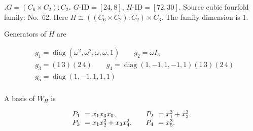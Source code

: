 \documentclass[12pt]{amsart}
\makeatletter
\numberwithin{equation}{section}
\theoremstyle{plain}
\theoremstyle{definition}
\theoremstyle{remark}
\DeclareMathOperator{\diag}{diag}
\newcommand{\PBasisLabel}[1]{\mathrlap{P_{#1}}\phantom{P_{99}}}
\newenvironment{SecEightAlignedBasis}[1]{%
  \begingroup\renewcommand{\arraystretch}{1.18}%
  \[\begin{array}{@{}#1@{}}%
}{\end{array}\]\endgroup}
\newenvironment{familydisplay}{%
  \begingroup
  \setlength{\arraycolsep}{1.35pt}%
  \renewcommand{\arraystretch}{0.96}%
  \setlength{\jot}{2pt}%
}{\endgroup}
\makeatother
\begin{document}
\par{}\medskip\noindent\textbf{.\enspace $G=(C_6\times C_2):C_2$.}\label{fam:threefold-no-14}
$G\text{-ID}=[24,8]$, $H\text{-ID}=[72,30]$.
Source cubic fourfold family: No.~62.  Here $H\cong((C_6\times C_2):C_2)\times C_3$.
The family dimension is $1$.
\par\smallskip\noindent Generators of $H$ are\par\nopagebreak
\begin{familydisplay}
\begin{align*}
&g_{1}=\diag(\omega^2,\omega^2,\omega,\omega,1)
\qquad g_{2}=\omega I_5\\
&g_{3}=(1\,3)(2\,4)\qquad
g_{4}=\diag(1,-1,1,-1,1)(1\,3)(2\,4)\\
&g_{5}=\diag(1,-1,1,1,1)\\
\end{align*}
\end{familydisplay}
\par\smallskip\noindent A basis of $W_H$ is\par\nopagebreak
\begin{familydisplay}
\begin{SecEightAlignedBasis}{l@{\qquad}l}
\PBasisLabel{1}=x_{1}x_{3}x_{5}, & \PBasisLabel{2}=x_{1}^{3}+x_{3}^{3},\\
\PBasisLabel{3}=x_{1}x_{2}^{2}+x_{3}x_{4}^{2}, & \PBasisLabel{4}=x_{5}^{3}.
\end{SecEightAlignedBasis}
\end{familydisplay}
\end{document}
